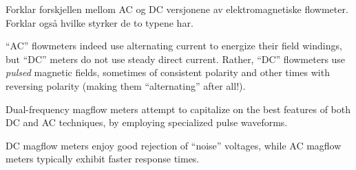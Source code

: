 

Forklar forskjellen mellom AC og DC versjonene av elektromagnetiske flowmeter. Forklar ogs{\aa} hvilke styrker de to typene har.







``AC'' flowmeters indeed use alternating current to energize their field windings, but ``DC'' meters do not use steady direct current.  Rather, ``DC'' flowmeters use {\it pulsed} magnetic fields, sometimes of consistent polarity and other times with reversing polarity (making them ``alternating'' after all!).

Dual-frequency magflow meters attempt to capitalize on the best features of both DC and AC techniques, by employing specialized pulse waveforms.

\vskip 10pt

DC magflow meters enjoy good rejection of ``noise'' voltages, while AC magflow meters typically exhibit faster response times.











